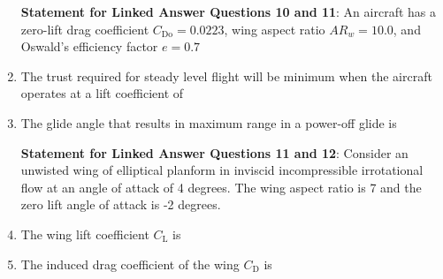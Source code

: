 \documentclass[journal,12pt,onecolumn]{IEEEtran}
\theoremstyle{remark}
\begin{document}
\begin{enumerate}
\textbf{Statement for Linked Answer Questions 10 and 11}: An aircraft has a zero-lift drag coefficient $C_{\text{Do}} = 0.0223$, wing aspect ratio $AR_{w} = 10.0 $, and Oswald's efficiency factor $e = 0.7$
\item The trust required for steady level flight will be minimum when the aircraft operates at a lift coefficient of 
\begin{enumerate}
\end{enumerate}
 \item The glide angle that results in maximum range in a power-off glide is
\begin{enumerate}
\end{enumerate}

\textbf{Statement for Linked Answer Questions 11 and 12}: Consider an unwisted wing of elliptical planform in inviscid incompressible irrotational flow at an angle of attack of 4 degrees. The wing aspect ratio is 7 and the zero lift angle of attack is -2 degrees.

\item The wing lift coefficient $C_{\text{L}}$ is 
\begin{enumerate}
\end{enumerate}
\item The induced drag coefficient of the wing $C_{\text{D}}$ is
\begin{enumerate}
\end{enumerate}


\end{enumerate}
\end{document}
